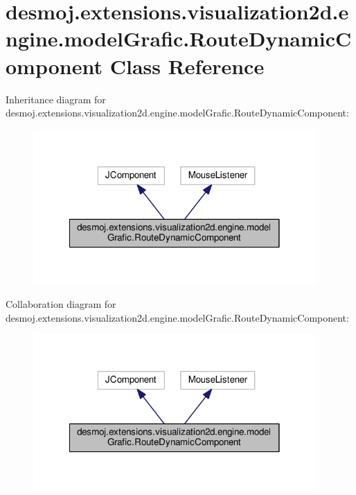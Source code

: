 \section{desmoj.\-extensions.\-visualization2d.\-engine.\-model\-Grafic.\-Route\-Dynamic\-Component Class Reference}
\label{classdesmoj_1_1extensions_1_1visualization2d_1_1engine_1_1model_grafic_1_1_route_dynamic_component}


Inheritance diagram for desmoj.\-extensions.\-visualization2d.\-engine.\-model\-Grafic.\-Route\-Dynamic\-Component\-:
\nopagebreak
\begin{figure}[H]
\begin{center}
\leavevmode
\includegraphics[width=306pt]{classdesmoj_1_1extensions_1_1visualization2d_1_1engine_1_1model_grafic_1_1_route_dynamic_component__inherit__graph}
\end{center}
\end{figure}


Collaboration diagram for desmoj.\-extensions.\-visualization2d.\-engine.\-model\-Grafic.\-Route\-Dynamic\-Component\-:
\nopagebreak
\begin{figure}[H]
\begin{center}
\leavevmode
\includegraphics[width=306pt]{classdesmoj_1_1extensions_1_1visualization2d_1_1engine_1_1model_grafic_1_1_route_dynamic_component__coll__graph}
\end{center}
\end{figure}
